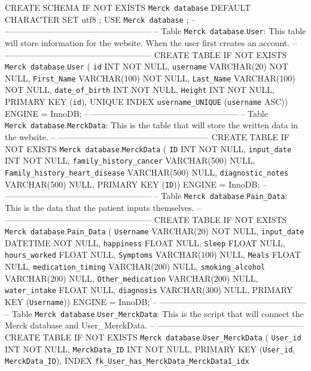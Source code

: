 \documentclass[]{book}
\begin{document}
CREATE SCHEMA IF NOT EXISTS \texttt{Merck\ database} DEFAULT CHARACTER
SET utf8 ; USE \texttt{Merck\ database} ; --
----------------------------------------------------- -- Table
\texttt{Merck\ database}.\texttt{User}: This table will store
information for the website. When the user first creates an account. --
----------------------------------------------------- CREATE TABLE IF
NOT EXISTS \texttt{Merck\ database}.\texttt{User} ( \texttt{id} INT NOT
NULL, \texttt{username} VARCHAR(20) NOT NULL, \texttt{First\_Name}
VARCHAR(100) NOT NULL, \texttt{Last\_Name} VARCHAR(100) NOT NULL,
\texttt{date\_of\_birth} INT NOT NULL, \texttt{Height} INT NOT NULL,
PRIMARY KEY (\texttt{id}), UNIQUE INDEX \texttt{username\_UNIQUE}
(\texttt{username} ASC)) ENGINE = InnoDB; --
----------------------------------------------------- -- Table
\texttt{Merck\ database}.\texttt{MerckData}: This is the table that will
store the written data in the website. --
------------------------------------------------------ CREATE TABLE IF
NOT EXISTS \texttt{Merck\ database}.\texttt{MerckData} ( \texttt{ID} INT
NOT NULL, \texttt{input\_date} INT NOT NULL,
\texttt{family\_history\_cancer} VARCHAR(500) NULL,
\texttt{Family\_history\_heart\_disease} VARCHAR(500) NULL,
\texttt{diagnostic\_notes} VARCHAR(500) NULL, PRIMARY KEY (\texttt{ID}))
ENGINE = InnoDB; --
----------------------------------------------------- -- Table
\texttt{Merck\ database}.\texttt{Pain\_Data}: This is the data that the
patient inputs themselves. --
----------------------------------------------------- CREATE TABLE IF
NOT EXISTS \texttt{Merck\ database}.\texttt{Pain\_Data} (
\texttt{Username} VARCHAR(20) NOT NULL, \texttt{input\_date} DATETIME
NOT NULL, \texttt{happiness} FLOAT NULL, \texttt{Sleep} FLOAT NULL,
\texttt{hours\_worked} FLOAT NULL, \texttt{Symptoms} VARCHAR(100) NULL,
\texttt{Meals} FLOAT NULL, \texttt{medication\_timing} VARCHAR(200)
NULL, \texttt{smoking\_alcohol} VARCHAR(200) NULL,
\texttt{Other\_medication} VARCHAR(200) NULL, \texttt{water\_intake}
FLOAT NULL, \texttt{diagnosis} VARCHAR(300) NULL, PRIMARY KEY
(\texttt{Username})) ENGINE = InnoDB; --
----------------------------------------------------- -- Table
\texttt{Merck\ database}.\texttt{User\_MerckData}: This is the script
that will connect the Merck database and User\_MerckData. --
----------------------------------------------------- CREATE TABLE IF
NOT EXISTS \texttt{Merck\ database}.\texttt{User\_MerckData} (
\texttt{User\_id} INT NOT NULL, \texttt{MerckData\_ID} INT NOT NULL,
PRIMARY KEY (\texttt{User\_id}, \texttt{MerckData\_ID}), INDEX
\texttt{fk\_User\_has\_MerckData\_MerckData1\_idx}
\end{document}
